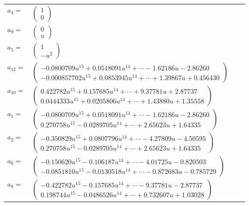 \documentclass[1p]{elsarticle_modified}
\theoremstyle{definition}
\begin{document}
\begin{tabular}{m{7pt} m{180pt} m{7pt} m{180pt} }
\flushright $a_{4}=$&$\begin{pmatrix}1\\0\end{pmatrix}$ \\
\flushright $a_{9}=$&$\begin{pmatrix}0\\u\end{pmatrix}$ \\
\flushright $a_{5}=$&$\begin{pmatrix}1\\- u^2\end{pmatrix}$ \\
\flushright $a_{12}=$&$\begin{pmatrix}-0.0800709 u^{15}+0.0518091 u^{14}+\cdots-1.62186 u-2.86260\\-0.000857702 u^{15}+0.0853945 u^{14}+\cdots+1.39867 u+0.456430\end{pmatrix}$ \\
\flushright $a_{10}=$&$\begin{pmatrix}0.422782 u^{15}+0.157685 u^{14}+\cdots+9.37781 u+2.87737\\0.0444333 u^{15}+0.0205806 u^{14}+\cdots+1.43880 u+1.35558\end{pmatrix}$ \\
\flushright $a_{1}=$&$\begin{pmatrix}-0.0800709 u^{15}+0.0518091 u^{14}+\cdots-1.62186 u-2.86260\\0.270758 u^{15}-0.0289705 u^{14}+\cdots+2.65623 u+1.64335\end{pmatrix}$ \\
\flushright $a_{2}=$&$\begin{pmatrix}-0.350829 u^{15}+0.0807796 u^{14}+\cdots-4.27809 u-4.50595\\0.270758 u^{15}-0.0289705 u^{14}+\cdots+2.65623 u+1.64335\end{pmatrix}$ \\
\flushright $a_{6}=$&$\begin{pmatrix}-0.150620 u^{15}-0.106187 u^{14}+\cdots-4.01725 u-0.820503\\-0.0851810 u^{15}-0.0130518 u^{14}+\cdots-0.872683 u-0.785729\end{pmatrix}$ \\
\flushright $a_{8}=$&$\begin{pmatrix}-0.422782 u^{15}-0.157685 u^{14}+\cdots-9.37781 u-2.87737\\0.198744 u^{15}-0.0486526 u^{14}+\cdots+0.732607 u+1.03028\end{pmatrix}$ \\

\end{tabular}
\end{document}
